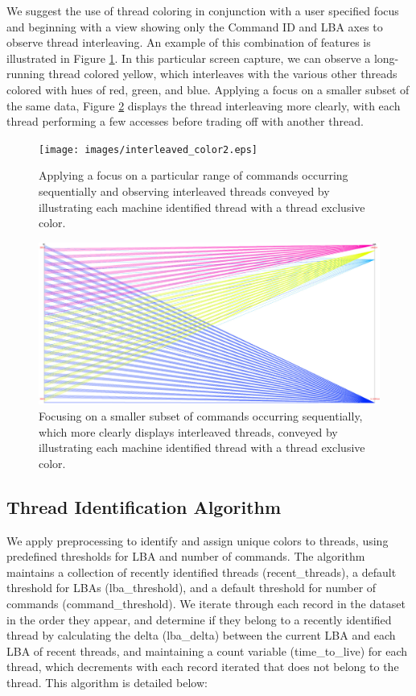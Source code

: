 \documentclass[journal]{vgtc}                %
\begin{document}
We suggest the use of thread coloring in conjunction with a user specified focus and beginning with a view showing only the Command ID and LBA axes to observe thread interleaving. An example of this combination of features is illustrated in Figure \ref{fig:color_focus1}. In this particular screen capture, we can observe a long-running thread colored yellow, which interleaves with the various other threads colored with hues of red, green, and blue. Applying a focus on a smaller subset of the same data, Figure \ref{fig:color_focus2} displays the thread interleaving more clearly, with each thread performing a few accesses before trading off with another thread.

\begin{figure}[h!]
 \centering
 \texttt{[image: images/interleaved\_color2.eps]}
 \caption[Identified threads rendered with a thread exclusive color.]{Applying a focus on a particular range of commands occurring sequentially and observing interleaved threads conveyed by illustrating each machine identified thread with a thread exclusive color.}
 \label{fig:color_focus1}
\end{figure}

\begin{figure}[h!]
 \centering
 \includegraphics[width=\columnwidth]{images/interleaved_color4.eps}
 \caption[A subset of data rendered with a thread exclusive colors.]{Focusing on a smaller subset of commands occurring sequentially, which more clearly displays interleaved threads, conveyed by illustrating each machine identified thread with a thread exclusive color.}
 \label{fig:color_focus2}
\end{figure}

\subsection{Thread Identification Algorithm}
We apply preprocessing to identify and assign unique colors to threads, using predefined thresholds for LBA and number of commands. The algorithm maintains a collection of recently identified threads (recent\_threads), a default threshold for LBAs (lba\_threshold), and a default threshold for number of commands (command\_threshold). We iterate through each record in the dataset in the order they appear, and determine if they belong to a recently identified thread by calculating the delta (lba\_delta) between the current LBA and each LBA of recent threads, and maintaining a count variable (time\_to\_live) for each thread, which decrements with each record iterated that does not belong to the thread. This algorithm is detailed below:
\end{document}
